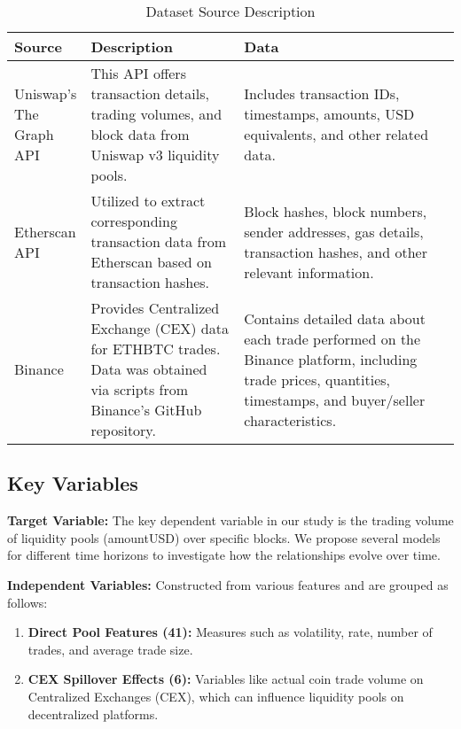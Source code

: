 \documentclass{article}
\begin{document}
\begin{table}[ht]
  \centering
  \small
  \begin{tabular}{|p{0.15\linewidth}|p{0.35\linewidth}|p{0.5\linewidth}|}
  \hline
  \textbf{Source} & \textbf{Description} & \textbf{Data} \\
  \hline
  Uniswap's The Graph API\cite{uniswapAPI} & This API offers transaction details, trading volumes, and block data from Uniswap v3 liquidity pools. & Includes transaction IDs, timestamps, amounts, USD equivalents, and other related data. \\
  \hline
  Etherscan API\cite{etherscanAPI} & Utilized to extract corresponding transaction data from Etherscan based on transaction hashes. & Block hashes, block numbers, sender addresses, gas details, transaction hashes, and other relevant information. \\
  \hline
  Binance\cite{binanceData} & Provides Centralized Exchange (CEX) data for ETHBTC trades. Data was obtained via scripts from Binance's GitHub repository. & Contains detailed data about each trade performed on the Binance platform, including trade prices, quantities, timestamps, and buyer/seller characteristics. \\
  \hline
  \end{tabular}
  \caption{Dataset Source Description}
  \label{tab:dataset-description}
  \end{table}

\subsection{\textbf{Key Variables}}

\textbf{Target Variable:} The key dependent variable in our study is the trading volume of liquidity pools (amountUSD) over specific blocks. We propose several models for different time horizons to investigate how the relationships evolve over time.

\textbf{Independent Variables:} Constructed from various features and are grouped as follows:

\begin{enumerate}[label=\arabic*. ,itemsep=0pt, topsep=0pt]
\item \textbf{Direct Pool Features (41):} Measures such as volatility, rate, number of trades, and average trade size.
\item \textbf{CEX Spillover Effects (6):} Variables like actual coin trade volume on Centralized Exchanges (CEX), which can influence liquidity pools on decentralized platforms.
\end{enumerate}
\end{document}
